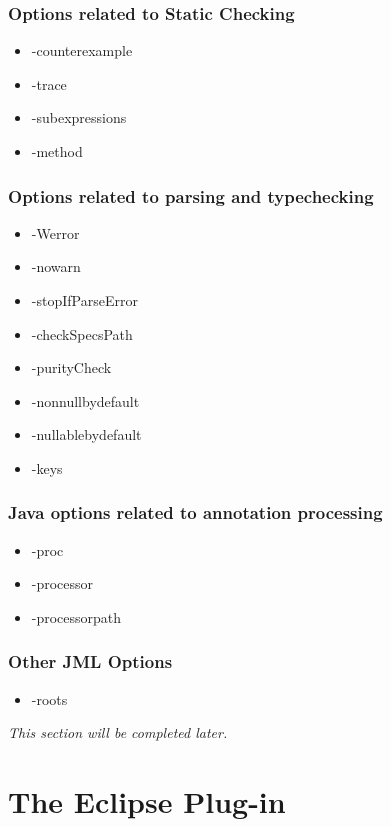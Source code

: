\documentclass{report}%
\begin{document}
\subsection{Options related to Static Checking}
\begin{itemize}
\item -counterexample
\item -trace
\item -subexpressions
\item -method
\end{itemize}

\subsection{Options related to parsing and typechecking}
\begin{itemize}
\item -Werror
\item -nowarn
\item -stopIfParseError
\item -checkSpecsPath
\item -purityCheck
\item -nonnullbydefault
\item -nullablebydefault
\item -keys
\end{itemize}

\subsection{Java options related to annotation processing}
\begin{itemize}
\item -proc
\item -processor
\item -processorpath
\end{itemize}

\subsection{Other JML Options}
\begin{itemize}
\item -roots
\end{itemize}


\textit{This section will be completed later.} %



\chapter{The Eclipse Plug-in}
\label{EclipsePlugin}
\end{document}
